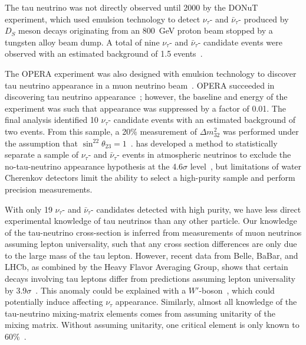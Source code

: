 The tau neutrino was not directly observed until 2000 by the DONuT experiment, which used emulsion technology to detect  $\nu_{\tau}$- and $\bar{\nu}_{\tau}$- produced by $D_S$ meson decays originating from an \SI{800}{GeV} proton beam stopped by a tungsten alloy beam dump.  A total of nine $\nu_{\tau}$- and $\bar{\nu}_{\tau}$- candidate events were observed with an estimated background of 1.5 events~\cite{Kodama:2000mp, Kodama:2007aa}.

The OPERA experiment was also designed with emulsion technology to discover tau neutrino appearance in a muon neutrino beam~\cite{Guler:2000bd}. OPERA succeeded in discovering tau neutrino appearance~\cite{Agafonova:2015jxn}; however, the baseline and energy of the experiment was such that appearance was suppressed by a factor of 0.01.   The final analysis identified 10 $\nu_{\tau}$- candidate events with an estimated background of two  events.  From this sample, a 20\% measurement of $\Delta m^{2}_{32}$ was performed under the assumption that $\sin^22\theta_{23} = 1$~\cite{Agafonova:2018auq}.  \superk has developed a method to statistically separate a sample of $\nu_{\tau}$- and $\bar{\nu}_{\tau}$- events in atmospheric neutrinos to exclude the no-tau-neutrino appearance hypothesis at the 4.6$\sigma$ level~\cite{Abe:2012jj, Li:2017dbe}, but limitations of water Cherenkov detectors limit the ability to select a high-purity sample and perform precision measurements.

With only 19 $\nu_{\tau}$- and $\bar{\nu}_{\tau}$- candidates detected with high purity, we have less direct experimental knowledge of tau neutrinos than any other   particle. Our knowledge of the tau-neutrino cross-section is inferred from measurements of muon neutrinos assuming lepton universality, such that any cross section differences are only due to the large mass of the tau lepton. However, recent data from Belle, BaBar, and LHCb, as combined by the Heavy Flavor Averaging Group, 
shows that certain decays involving tau leptons differ from   predictions assuming lepton universality by 3.9$\sigma$~\cite{Amhis:2016xyh}.  This anomaly could be explained with a $W'$-boson~\cite{Greljo:2018ogz}, which could potentially induce   affecting $\nu_{\tau}$ appearance.  Similarly, almost all knowledge of the tau-neutrino mixing-matrix elements comes from assuming unitarity of the mixing matrix. Without assuming unitarity, one critical element is only known to 60\%~\cite{Parke:2015goa}.

